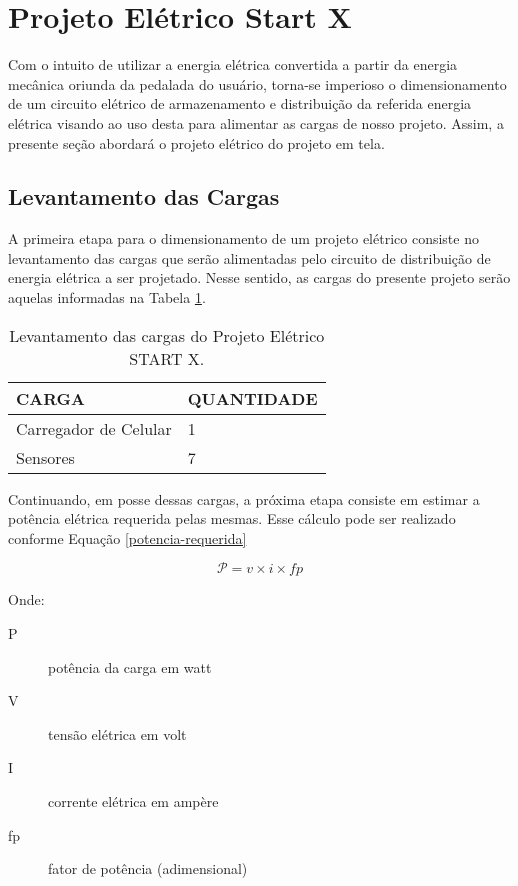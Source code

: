 \section{Projeto Elétrico Start X}

Com o intuito de utilizar a energia elétrica convertida a partir da energia mecânica oriunda da pedalada do usuário, torna-se imperioso o dimensionamento de um circuito elétrico de armazenamento e distribuição da referida energia elétrica visando ao uso desta para alimentar as cargas de nosso projeto. Assim, a presente seção abordará o projeto elétrico do projeto em tela.

\subsection{Levantamento das Cargas}
\label{levantamento-cargas}

A primeira etapa para o dimensionamento de um projeto elétrico consiste no levantamento das cargas que serão alimentadas pelo circuito de distribuição de energia elétrica a ser projetado. Nesse sentido, as cargas do presente projeto serão aquelas informadas na Tabela \ref{cargas-dispositivos}.

\begin{table}[h]
\centering
\begin{tabular}{|l|l|}
\hline
\rowcolor[HTML]{329A9D} 
CARGA                                                           & QUANTIDADE \\ \hline
Carregador de Celular & 1          \\ \hline
Sensores                                                        & 7          \\ \hline
\end{tabular}
\caption{Levantamento das cargas do Projeto Elétrico START X.}
\label{cargas-dispositivos}
\end{table}

Continuando, em posse dessas cargas, a próxima etapa consiste em estimar a potência elétrica requerida pelas mesmas. Esse cálculo pode ser realizado conforme Equação \ref{potencia-requerida}

\begin{equation}
	\mathcal{P} = v \times i \times fp
	\label{potencia-requerida}
\end{equation}

Onde:
\begin{description}

\item [P] potência da carga em watt

\item [V] tensão elétrica em volt

\item [I] corrente elétrica em ampère

\item [fp] fator de potência (adimensional)
\end{description}

